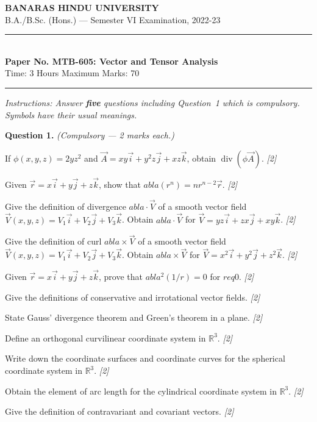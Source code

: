 \documentclass[11pt,a4paper]{article}
\newcommand{\pts}[1]{\hfill   \textit{[#1]}}
\begin{document}
\begin{center}
  {\large\bfseries BANARAS HINDU UNIVERSITY}\\[2pt]
  {\normalsize B.A./B.Sc. (Hons.) --- Semester VI Examination, 2022-23}\\[6pt]
  \rule{0.8\linewidth}{0.5pt}\\[6pt]
  {\large\bfseries Paper No. MTB-605: Vector and Tensor Analysis}\\[4pt]
  {\normalsize Time: 3 Hours \hfill Maximum Marks: 70}
\end{center}
\rule{\linewidth}{0.4pt}
\smallskip



\noindent   \textit{Instructions: Answer   \textbf{five} questions including Question~1 which is compulsory. Symbols have their usual meanings.}
\bigskip




\noindent   \textbf{Question 1.}   \textit{(Compulsory --- 2 marks each.)}

\begin{parts}
  \item If $\phi(x,y,z) = 2yz^2$ and $\vec{A} = xy\vec{i} + y^2 z\vec{j} + xz\vec{k}$, obtain $\operatorname{div}(\phi \vec{A})$. \pts{2}
  \item Given $\vec{r} = x\vec{i} + y\vec{j} + z\vec{k}$, show that $
abla(r^n) = n r^{n-2}\vec{r}$. \pts{2}
  \item Give the definition of divergence $
abla \cdot \vec{V}$ of a smooth vector field $\vec{V}(x,y,z) = V_1\vec{i} + V_2\vec{j} + V_3\vec{k}$. Obtain $
abla \cdot \vec{V}$ for $\vec{V} = yz\vec{i} + zx\vec{j} + xy\vec{k}$. \pts{2}
  \item Give the definition of curl $
abla  \times \vec{V}$ of a smooth vector field $\vec{V}(x,y,z) = V_1\vec{i} + V_2\vec{j} + V_3\vec{k}$. Obtain $
abla  \times \vec{V}$ for $\vec{V} = x^2\vec{i} + y^2\vec{j} + z^2\vec{k}$. \pts{2}
  \item Given $\vec{r} = x\vec{i} + y\vec{j} + z\vec{k}$, prove that $
abla^2(1/r) = 0$ for $r 
eq 0$. \pts{2}
  \item Give the definitions of conservative and irrotational vector fields. \pts{2}
  \item State Gauss' divergence theorem and Green's theorem in a plane. \pts{2}
  \item Define an orthogonal curvilinear coordinate system in $\mathbb{R}^3$. \pts{2}
  \item Write down the coordinate surfaces and coordinate curves for the spherical coordinate system in $\mathbb{R}^3$. \pts{2}
  \item Obtain the element of arc length for the cylindrical coordinate system in $\mathbb{R}^3$. \pts{2}
  \item Give the definition of contravariant and covariant vectors. \pts{2}
\end{parts}
\end{document}
